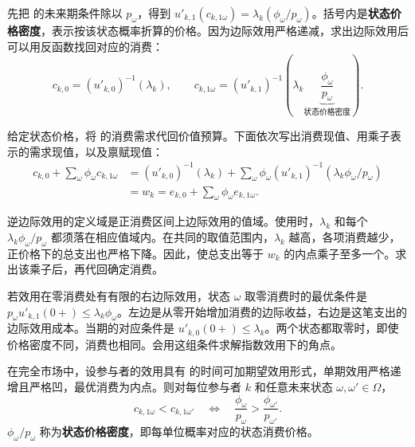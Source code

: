 先把 的未来期条件除以 $p_\omega$，得到 $u'_{k,1}(c_{k,1\omega})=\lambda_k(\phi_\omega/p_\omega)$。括号内是\textbf{状态价格密度}，表示按该状态概率折算的价格。因为边际效用严格递减，求出边际效用后可以用反函数找回对应的消费：
\begin{equation}
 c_{k,0}=(u'_{k,0})^{-1}(\lambda_k),\qquad
 c_{k,1\omega}=(u'_{k,1})^{-1}\!\left(
 \lambda_k\underbrace{\frac{\phi_\omega}{p_\omega}}_{\text{状态价格密度}}\right).
 \label{eq:wj-10-4}
\end{equation}

给定状态价格，将 的消费需求代回价值预算。下面依次写出消费现值、用乘子表示的需求现值，以及禀赋现值：
\begin{equation}
 \begin{aligned}
 c_{k,0}+\sum_\omega\phi_\omega c_{k,1\omega}
 &=(u'_{k,0})^{-1}(\lambda_k)+\sum_\omega\phi_\omega
 (u'_{k,1})^{-1}(\lambda_k\phi_\omega/p_\omega)\\
 &=w_k=e_{k,0}+\sum_\omega\phi_\omega e_{k,1\omega}.
 \end{aligned}
 \label{eq:wj-10-5}
\end{equation}

逆边际效用的定义域是正消费区间上边际效用的值域。使用时，$\lambda_k$ 和每个 $\lambda_k\phi_\omega/p_\omega$ 都须落在相应值域内。在共同的取值范围内，$\lambda_k$ 越高，各项消费越少，正价格下的总支出也严格下降。因此，使总支出等于 $w_k$ 的内点乘子至多一个。求出该乘子后，再代回确定消费。

若效用在零消费处有有限的右边际效用，状态 $\omega$ 取零消费时的最优条件是 $p_\omega u'_{k,1}(0+)\le\lambda_k\phi_\omega$。左边是从零开始增加消费的边际收益，右边是这笔支出的边际效用成本。当期的对应条件是 $u'_{k,0}(0+)\le\lambda_k$。两个状态都取零时，即使价格密度不同，消费也相同。会用这组条件求解指数效用下的角点。

\begin{tcolorbox}[knowledge]
 在完全市场中，设参与者的效用具有 的时间可加期望效用形式，单期效用严格递增且严格凹，最优消费为内点。则对每位参与者 $k$ 和任意未来状态 $\omega,\omega'\in\Omega$，
\[
 c_{k,1\omega}<c_{k,1\omega'}
 \quad\Longleftrightarrow\quad
 \frac{\phi_\omega}{p_\omega}>\frac{\phi_{\omega'}}{p_{\omega'}}.
\]
$\phi_\omega/p_\omega$ 称为\textbf{状态价格密度}，即每单位概率对应的状态消费价格。
\end{tcolorbox}

